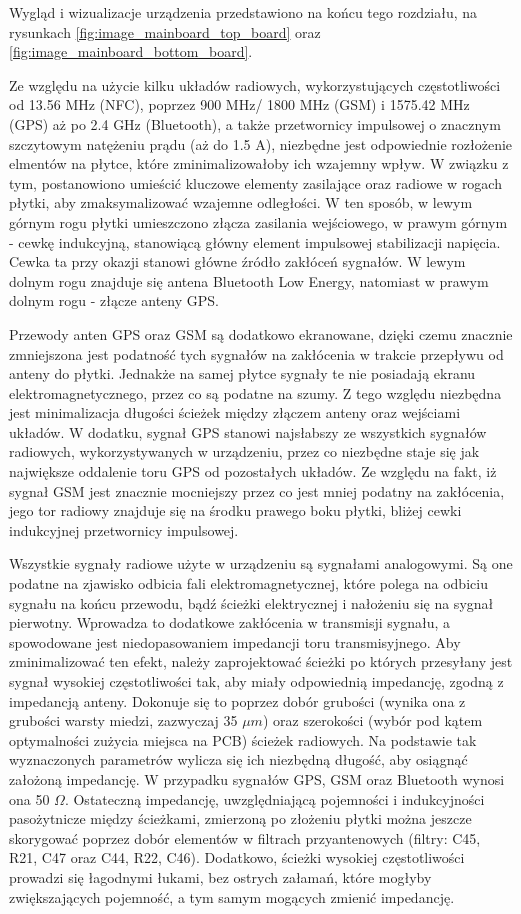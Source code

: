 Wygląd i wizualizacje urządzenia przedstawiono na końcu tego rozdziału, na rysunkach \ref{fig:image_mainboard_top_board} oraz \ref{fig:image_mainboard_bottom_board}.

Ze względu na użycie kilku układów radiowych, wykorzystujących częstotliwości od 13.56 MHz (NFC), poprzez 900 MHz/ 1800 MHz (GSM) i 1575.42 MHz (GPS) aż po 2.4 GHz (Bluetooth), a także przetwornicy impulsowej o znacznym szczytowym natężeniu prądu (aż do 1.5 A), niezbędne jest odpowiednie rozłożenie elmentów na płytce, które zminimalizowałoby ich wzajemny wpływ. W związku z tym, postanowiono umieścić kluczowe elementy zasilające oraz radiowe w rogach płytki, aby zmaksymalizować wzajemne odległości. W ten sposób, w lewym górnym rogu płytki umieszczono złącza zasilania wejściowego, w prawym górnym - cewkę indukcyjną, stanowiącą główny element impulsowej stabilizacji napięcia. Cewka ta przy okazji stanowi główne źródło zakłóceń sygnałów. W lewym dolnym rogu znajduje się antena Bluetooth Low Energy, natomiast w prawym dolnym rogu - złącze anteny GPS. 

Przewody anten GPS oraz GSM są dodatkowo ekranowane, dzięki czemu znacznie zmniejszona jest podatność tych sygnałów na zakłócenia w trakcie przepływu od anteny do płytki. Jednakże na samej płytce sygnały te nie posiadają ekranu elektromagnetycznego, przez co są podatne na szumy. Z tego względu niezbędna jest minimalizacja długości ścieżek między złączem anteny oraz wejściami układów. W dodatku, sygnał GPS stanowi najsłabszy ze wszystkich sygnałów radiowych, wykorzystywanych w urządzeniu, przez co niezbędne staje się  jak największe oddalenie toru GPS od pozostałych układów. Ze względu na fakt, iż sygnał GSM jest znacznie mocniejszy przez co jest mniej podatny na zakłócenia, jego tor radiowy znajduje się na środku prawego boku płytki, bliżej cewki indukcyjnej przetwornicy impulsowej. 

Wszystkie sygnały radiowe użyte w urządzeniu są sygnałami analogowymi. Są one podatne na zjawisko odbicia fali elektromagnetycznej, które polega na odbiciu sygnału na końcu przewodu, bądź ścieżki elektrycznej i nałożeniu się na sygnał pierwotny. Wprowadza to dodatkowe zakłócenia w transmisji sygnału, a spowodowane jest niedopasowaniem impedancji toru transmisyjnego. Aby zminimalizować ten efekt, należy zaprojektować ścieżki po których przesyłany jest sygnał wysokiej częstotliwości tak, aby miały odpowiednią impedancję, zgodną z impedancją anteny. Dokonuje się to poprzez dobór grubości (wynika ona z grubości warsty miedzi, zazwyczaj 35 $\mu m$) oraz szerokości (wybór pod kątem optymalności zużycia miejsca na PCB) ścieżek radiowych. Na podstawie tak wyznaczonych parametrów wylicza się ich niezbędną długość, aby osiągnąć założoną impedancję. W przypadku sygnałów GPS, GSM oraz Bluetooth wynosi ona 50 $\Omega$. Ostateczną impedancję, uwzględniającą pojemności i indukcyjności pasożytnicze między ścieżkami, zmierzoną po złożeniu płytki można jeszcze skorygować poprzez dobór elementów w filtrach przyantenowych (filtry: C45, R21, C47 oraz C44, R22, C46). Dodatkowo, ścieżki wysokiej częstotliwości prowadzi się łagodnymi łukami, bez ostrych załamań, które mogłyby zwiększających pojemność, a tym samym mogących zmienić impedancję. 

